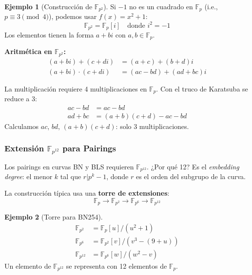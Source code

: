 \documentclass[11pt,a4paper,twoside,openright]{book}
\theoremstyle{definition}
\newtheorem{example}{Ejemplo}[chapter]
\theoremstyle{plain}
\theoremstyle{remark}
\begin{document}
\begin{example}[Construcción de $\mathbb{F}_{p^2}$]
Si $-1$ no es un cuadrado en $\mathbb{F}_p$ (i.e., $p \equiv 3 \pmod 4$), podemos usar $f(x) = x^2 + 1$:
\[ \mathbb{F}_{p^2} = \mathbb{F}_p[i] \quad \text{donde } i^2 = -1 \]
Los elementos tienen la forma $a + bi$ con $a, b \in \mathbb{F}_p$.
\end{example}

\textbf{Aritmética en $\mathbb{F}_{p^2}$:}
\begin{align*}
    (a + bi) + (c + di) &= (a+c) + (b+d)i \\
    (a + bi) \cdot (c + di) &= (ac - bd) + (ad + bc)i
\end{align*}

\begin{mathnote}
La multiplicación requiere 4 multiplicaciones en $\mathbb{F}_p$. Con el truco de Karatsuba se reduce a 3:
\begin{align*}
    ac - bd &= ac - bd \\
    ad + bc &= (a+b)(c+d) - ac - bd
\end{align*}
Calculamos $ac$, $bd$, $(a+b)(c+d)$: solo 3 multiplicaciones.
\end{mathnote}

\subsubsection{Extensión $\mathbb{F}_{p^{12}}$ para Pairings}

\begin{intuicion}
Los pairings en curvas BN y BLS requieren $\mathbb{F}_{p^{12}}$. ¿Por qué 12? Es el \textit{embedding degree}: el menor $k$ tal que $r | p^k - 1$, donde $r$ es el orden del subgrupo de la curva.
\end{intuicion}

La construcción típica usa una \textbf{torre de extensiones}:
\[ \mathbb{F}_p \to \mathbb{F}_{p^2} \to \mathbb{F}_{p^6} \to \mathbb{F}_{p^{12}} \]

\begin{example}[Torre para BN254]
\begin{align*}
    \mathbb{F}_{p^2} &= \mathbb{F}_p[u] / (u^2 + 1) \\
    \mathbb{F}_{p^6} &= \mathbb{F}_{p^2}[v] / (v^3 - (9 + u)) \\
    \mathbb{F}_{p^{12}} &= \mathbb{F}_{p^6}[w] / (w^2 - v)
\end{align*}
Un elemento de $\mathbb{F}_{p^{12}}$ se representa con 12 elementos de $\mathbb{F}_p$.
\end{example}
\end{document}
